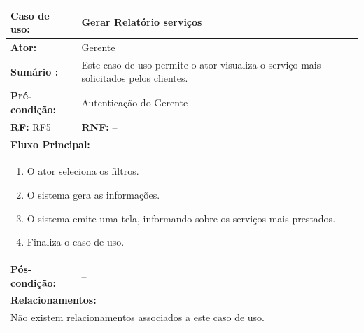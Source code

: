 \documentclass[
	12pt,				%
	openright,
	oneside,			%
	a4paper,			%
	chapter=TITLE,		%
	brazil				%
	]{abntex2}
\begin{document}
\begin{table}[h]
\centering
\begin{tabular}{|p{3cm}|p{3cm}|p{3cm}|p{3cm}|}
\hline
\textbf{Caso de uso:}             & \multicolumn{3}{p{9cm}|}{Gerar Relatório serviços}				 \\ \hline
\textbf{Ator:}                 & \multicolumn{3}{p{9cm}|}{Gerente}         			          						 	\\ \hline
\textbf{Sumário :}                & \multicolumn{3}{p{9cm}|}{Este caso de uso permite o ator visualiza %
													o serviço mais solicitados pelos clientes.}         	\\ \hline
\textbf{Pré-condição:}            & \multicolumn{3}{p{9cm}|}{ Autenticação do Gerente }                				    \\ \hline
\multicolumn{2}{|p{6cm}|}{\textbf{RF:} RF5 }                  & \multicolumn{2}{p{6cm}|}{\textbf{RNF:} --}     	    \\ \hline
\multicolumn{4}{|p{12cm}|}{\textbf{Fluxo Principal:}}                                                					\\ \hline
\multicolumn{4}{|p{12cm}|}{%
\begin{enumerate}
  \item O ator seleciona os filtros.
  \item O sistema gera as informações.
  \item O sistema emite uma tela, informando sobre os serviços mais prestados.
  \item Finaliza o caso de uso.
\end{enumerate}}                                                               				 							\\ \hline
\textbf{Pós-condição: }  & \multicolumn{3}{p{9cm}|}{ -- }		\\ \hline
\multicolumn{4}{|p{12cm}|}{\textbf{Relacionamentos:}}                                        								\\ \hline
\multicolumn{4}{|p{12cm}|}{Não existem relacionamentos associados a este caso de uso.}                                  \\ \hline
\end{tabular}
\end{table}
\end{document}
